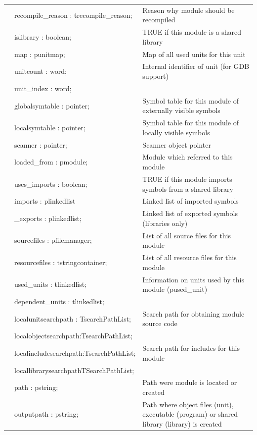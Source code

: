 \documentclass [a4paper,12pt]{article}
\begin{document}
\begin{longtable}{|l@{\extracolsep{\fill}}lp{7cm}|}
&\textsf{recompile{\_}reason : trecompile{\_}reason;}& Reason why module should be recompiled \\
&\textsf{islibrary : boolean;}& 		TRUE if this module is a shared library \\
&\textsf{map : punitmap;}		& Map of all used units for this unit \\
&\textsf{unitcount : word;}		& Internal identifier of unit (for GDB support) \\
&\textsf{unit{\_}index : word;}		&  \\
&\textsf{globalsymtable : pointer;}	& Symbol table for this module of externally visible symbols \\
&\textsf{localsymtable : pointer;}	& Symbol table for this module of locally visible symbols \\
&\textsf{scanner : pointer;}		& Scanner object pointer \\
&\textsf{loaded{\_}from : pmodule;}	& Module which referred to this module \\
&\textsf{uses{\_}imports : boolean;}	& TRUE if this module imports symbols from a shared library \\
&\textsf{imports : plinkedlist}		& Linked list of imported symbols \\
&\textsf{{\_}exports : plinkedlist;}	& Linked list of exported symbols (libraries only) \\
&\textsf{sourcefiles : pfilemanager;}	& List of all source files for this module \\
&\textsf{resourcefiles : tstringcontainer;} & List of all resource files for this module \\
&\textsf{used{\_}units : tlinkedlist; }	& Information on units used by this module (pused{\_}unit) \\
&\textsf{dependent{\_}units : tlinkedlist;}&  \\
&\textsf{localunitsearchpath : TsearchPathList;}& Search path for obtaining module source code \\
&\textsf{localobjectsearchpath:TsearchPathList;}&  \\
&\textsf{localincludesearchpath:TsearchPathList;}& Search path for includes for this module \\
&\textsf{locallibrarysearchpathTSearchPathList;}&  \\
&\textsf{path : pstring;}& Path were module is located or created \\
&\textsf{outputpath : pstring;}& Path where object files (unit), executable (program) or shared library (library) is created \\

\end{longtable}
\end{document}
